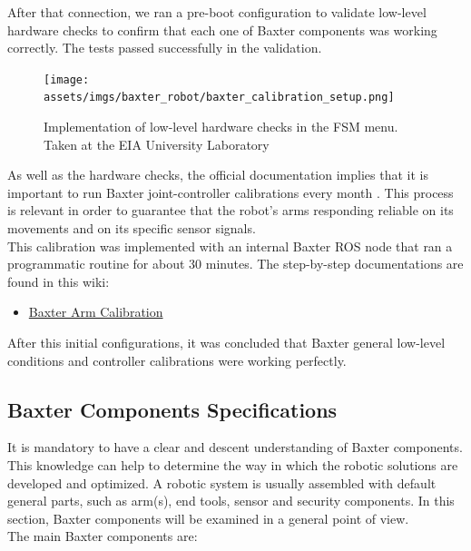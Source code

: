 \documentclass[11pt]{report} %
\begin{document}
After that connection, we ran a pre-boot configuration to validate low-level hardware checks to confirm that each one of Baxter components was working correctly. The tests passed successfully in the validation.\\

\begin{figure}[H]
    \centering
    \texttt{[image: assets/imgs/baxter\_robot/baxter\_calibration\_setup.png]}
    \caption{Implementation of low-level hardware checks in the FSM menu. Taken at the EIA University Laboratory} 
    \label{fig_low_level_checks_fsm}
\end{figure}


As well as the hardware checks, the official documentation implies that it is important to run Baxter joint-controller calibrations every month \citep{cite_baxter_arms_calibartion}. This process is relevant in order to guarantee that the robot's arms responding reliable on its movements and on its specific sensor signals.\\

This calibration was implemented with an internal Baxter ROS node that ran a programmatic routine for about 30 minutes. The step-by-step documentations are found in this wiki:

\begin{itemize}
    \color{blue}
    \item \href{https://sdk.rethinkrobotics.com/wiki/Arm_Calibration}{Baxter Arm Calibration}
\end{itemize}

After this initial configurations, it was concluded that Baxter general low-level conditions and controller calibrations were working perfectly.\\


\subsection{Baxter Components Specifications}

It is mandatory to have a clear and descent understanding of Baxter components. This knowledge can help to determine the way in which the robotic solutions are developed and optimized. A robotic system is usually assembled with default general parts, such as arm(s), end tools, sensor and security components. In this section, Baxter components will be examined in a general point of view.\\

The main Baxter components are:
\end{document}
